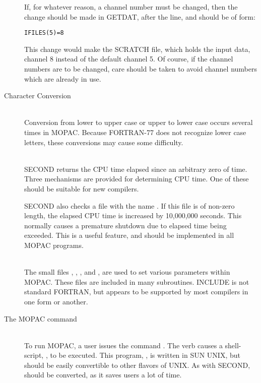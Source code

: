 \begin{description}
If, for whatever reason, a channel number must be changed, then the change
should be made in GETDAT, after the  line, and should be of
form:
\begin{verbatim}
IFILES(5)=8
\end{verbatim}
This change would make the SCRATCH file, which holds the input data,  channel
8 instead of the default channel 5.  Of course, if the channel numbers are
to be changed, care should be taken to avoid channel numbers which are
already in use.

\item[Character Conversion]~\\
Conversion from lower to upper case or upper to lower case occurs several times
in MOPAC.  Because FORTRAN-77 does not recognize lower case letters, these
conversions may cause some difficulty.

\item[\comp{SECOND}]~\\
SECOND returns the CPU time elapsed since an arbitrary zero of time. Three
mechanisms are provided for determining CPU time.  One of these should  be
suitable for new compilers.

SECOND also checks a file with the  name .  If this
file is of non-zero length, the elapsed CPU time is increased by 10,000,000
seconds. This normally causes a premature shutdown due to elapsed time being
exceeded. This is a useful feature, and should be implemented in all MOPAC
programs.

\item[\comp{INCLUDE}]~\\
The small files , , , and
, are used to set various parameters within MOPAC. These files
are included in many subroutines. INCLUDE is not standard FORTRAN, but appears
to be supported by most compilers in one form or another.

\item[The MOPAC command]~\\
To run MOPAC, a user issues the command .  The verb
 causes a shell-script, , to be executed.  This
program, , is written in SUN UNIX, but should be easily
convertible to other flavors of UNIX.  As with SECOND,  should
be converted, as it saves users a lot of time.
\end{description}
